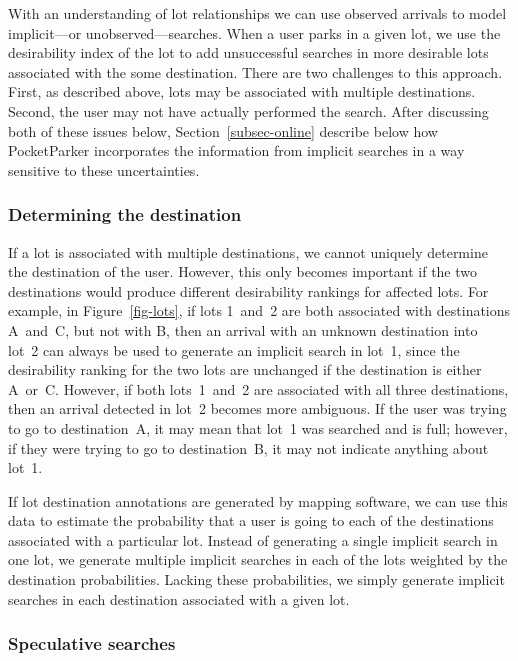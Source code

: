 With an understanding of lot relationships we can use observed arrivals to
model implicit---or unobserved---searches. When a user parks in a given lot,
we use the desirability index of the lot to add unsuccessful searches in more
desirable lots associated with the some destination. There are two challenges
to this approach. First, as described above, lots may be associated with
multiple destinations. Second, the user may not have actually performed the
search. After discussing both of these issues below,
Section~\ref{subsec-online} describe below how PocketParker incorporates the
information from implicit searches in a way sensitive to these uncertainties.

\subsubsection{Determining the destination}

If a lot is associated with multiple destinations, we cannot uniquely
determine the destination of the user. However, this only becomes important
if the two destinations would produce different desirability rankings for
affected lots. For example, in Figure~\ref{fig-lots}, if lots 1~and~2 are
both associated with destinations A~and~C, but not with B, then an arrival
with an unknown destination into lot~2 can always be used to generate an
implicit search in lot~1, since the desirability ranking for the two lots are
unchanged if the destination is either A~or~C. However, if both lots~1~and~2
are associated with all three destinations, then an arrival detected in lot~2
becomes more ambiguous. If the user was trying to go to destination~A, it may
mean that lot~1 was searched and is full; however, if they were trying to go
to destination~B, it may not indicate anything about lot~1. 

If lot destination annotations are generated by mapping software, we can use
this data to estimate the probability that a user is going to each of the
destinations associated with a particular lot. Instead of generating a single
implicit search in one lot, we generate multiple implicit searches in each of
the lots weighted by the destination probabilities. Lacking these
probabilities, we simply generate implicit searches in each destination
associated with a given lot.

\subsubsection{Speculative searches}

